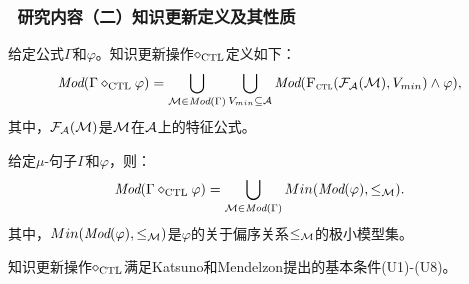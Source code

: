 \documentclass[aspectratio=1610, 9pt, CJK]{beamer}
\begin{document}
\begin{frame}
	\frametitle{~研究内容（二）知识更新定义及其性质}
	  
		\begin{definition} 
			给定公式$\Gamma$和$\varphi$。知识更新操作$\diamond_{\textrm{CTL}}$定义如下：
			\[
			\textit{Mod}(\Gamma \diamond_{\textrm{CTL}} \varphi) = \bigcup_{{\cal M} \in \textit{Mod}(\Gamma)} \bigcup_{V_{min}\subseteq {\cal A}} \textit{Mod}({\textsc{F}_{\textsc{ctl}}}({\cal F}_{{\cal A}}({\cal M}), V_{min}) \wedge \varphi),
			\]
			其中，${\cal F}_{{\cal A}}({\cal M})$是${\cal M}$在${\cal A}$上的特征公式。%
		\end{definition}
		\begin{theorem} 
			给定$\mu$-句子$\Gamma$和$\varphi$，则：
			\[\textit{Mod}(\Gamma \diamond_{\textrm{CTL}} \varphi) = \bigcup_{{\cal M}\in \textit{Mod}(\Gamma)} Min(\textit{Mod}(\varphi), \leq_{{\cal M}}).
			\]
			其中，$Min(\textit{Mod}(\varphi), \leq_{{\cal M}})$是$\varphi$的关于偏序关系$\leq_{{\cal M}}$的极小模型集。
		\end{theorem}
		
		\begin{theorem}\label{thm:U1toU8}
			知识更新操作$\diamond_{\textrm{CTL}}$满足Katsuno和Mendelzon提出的基本条件(U1)-(U8)。
		\end{theorem}
\end{frame}
\end{document}
